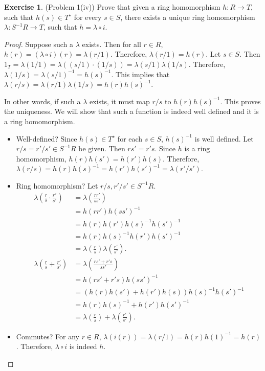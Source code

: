 \documentclass[12pt, psamsfonts]{amsart}
\theoremstyle{definition}
\newtheorem*{exer}{Exercise}
\theoremstyle{remark}
\numberwithin{equation}{section}
\begin{document}
\begin{exer}{(Problem 1(iv))}
  Prove that given a ring homomorphism $h: R \rightarrow T$, such that $h(s) \in T^{\star}$ for every $s \in S$, there exists a unique ring homomorphism $\lambda: S^{-1}R \rightarrow T$, such that $h = \lambda \circ i$.
\end{exer}

\begin{proof}
  Suppose such a $\lambda$ exists.
  Then for all $r \in R$, $h(r) = (\lambda \circ i)(r) = \lambda(r / 1)$.
  Therefore, $\lambda(r / 1) = h(r)$.
  Let $s \in S$.
  Then $1_T = \lambda(1 / 1) = \lambda((s / 1) \cdot (1 / s)) = \lambda(s / 1)\lambda(1 / s)$.
  Therefore, $\lambda(1 / s) = \lambda(s / 1)^{-1} = h(s)^{-1}$.
  This implies that $\lambda(r / s) = \lambda(r / 1)\lambda(1 / s) = h(r)h(s)^{-1}$.

  In other words, if such a $\lambda$ exists, it must map $r / s$ to $h(r)h(s)^{-1}$.
  This proves the uniqueness.
  We will show that such a function is indeed well defined and it is a ring homomorphism.
  \begin{itemize}
    \item
      Well-defined?
      Since $h(s) \in T^{\star}$ for each $s \in S$, $h(s)^{-1}$ is well defined.
      Let $r / s = r' / s' \in S^{-1}R$ be given.
      Then $rs' = r's$.
      Since $h$ is a ring homomorphism, $h(r)h(s') = h(r')h(s)$.
      Therefore, $\lambda(r / s) = h(r)h(s)^{-1} = h(r')h(s')^{-1} = \lambda(r' / s')$.
    \item
      Ring homomorphism?
      Let $r / s, r' / s' \in S^{-1}R$.
      \begin{align*}
        \lambda(\frac{r}{s} \cdot \frac{r'}{s'})
          &= \lambda(\frac{rr'}{ss'}) \\ 
          &= h(rr')h(ss')^{-1} \\
          &= h(r)h(r')h(s)^{-1}h(s')^{-1} \\
          &= h(r)h(s)^{-1}h(r')h(s')^{-1} \\
          &= \lambda(\frac{r}{s})\lambda(\frac{r'}{s'}). \\
        \lambda(\frac{r}{s} + \frac{r'}{s'})
          &= \lambda(\frac{rs' + r's}{ss'}) \\
          &= h(rs' + r's)h(ss')^{-1} \\
          &= (h(r)h(s') + h(r')h(s))h(s)^{-1}h(s')^{-1} \\
          &= h(r)h(s)^{-1} + h(r')h(s')^{-1} \\
          &= \lambda(\frac{r}{s}) + \lambda(\frac{r'}{s'}).
      \end{align*}
    \item
      Commutes?
      For any $r \in R$, $\lambda(i(r)) = \lambda(r / 1) = h(r)h(1)^{-1} = h(r)$.
      Therefore, $\lambda \circ i$ is indeed $h$.
  \end{itemize}
\end{proof}
\end{document}
